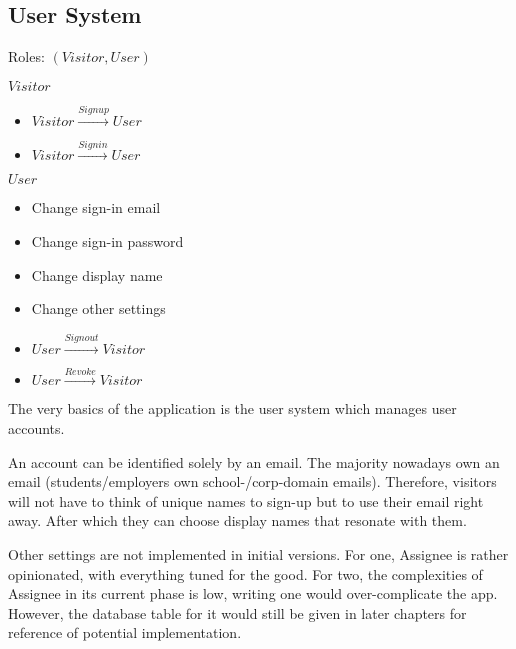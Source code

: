 \subsection{User System}
\label{overview.capab.user}

Roles: $(Visitor, User)$

$Visitor$
\begin{itemize}
	\item $Visitor\xrightarrow{Signup}User$

	\item $Visitor\xrightarrow{Signin}User$
\end{itemize}

$User$
\begin{itemize}
	\item Change sign-in email

	\item Change sign-in password

	\item Change display name

	\item Change other settings \textdagger{}

	\item $User\xrightarrow{Signout}Visitor$

	\item $User\xrightarrow{Revoke}Visitor$
\end{itemize}

The very basics of the application is the user system which manages user accounts.

An account can be identified solely by an email. The majority nowadays own an
email (students/employers own school-/corp-domain emails). Therefore, visitors will
not have to think of unique names to sign-up but to use their email right away.
After which they can choose display names that resonate with them.

\textdagger{} Other settings are not implemented in initial versions. For one, Assignee
is rather opinionated, with everything tuned for the good. For two, the
complexities of Assignee in its current phase is low, writing one would over-complicate
the app. However, the database table for it would still be given in later chapters
for reference of potential implementation.


